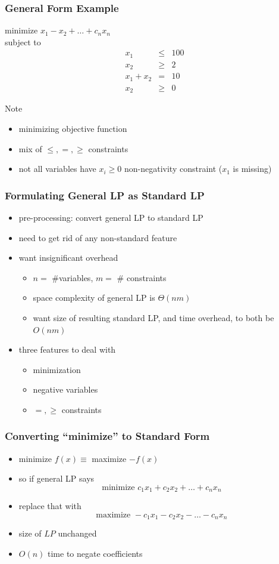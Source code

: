 \documentclass{beamer}
\begin{document}
\begin{frame} \frametitle{General Form Example}
  minimize $x_1 - x_2 + \ldots + c_n x_n$ \\
  subject to
  \begin{eqnarray*}
    x_1 &\leq& 100 \\
    x_2 &\geq& 2 \\
    x_1 + x_2 &=& 10 \\
    x_2 &\geq& 0
  \end{eqnarray*}

Note
\begin{itemize}
  \item minimizing objective function
  \item mix of $\leq, =, \geq$ constraints
  \item not all variables have $x_i \geq 0$ non-negativity constraint ($x_1$ is missing)
\end{itemize}
\end{frame}

\begin{frame} \frametitle{Formulating General LP as Standard LP}
  \begin{itemize}
    \item pre-processing: convert general LP to standard LP
    \item need to get rid of any non-standard feature
    \item want insignificant overhead
    \begin{itemize}
      \item $n = $ \#variables, $m = $ \# constraints
      \item space complexity of general LP is $\Theta(nm)$
      \item want size of resulting standard LP, and time overhead, to both be
      $O(nm)$
    \end{itemize}
    \item three features to deal with
    \begin{itemize}
      \item minimization
      \item negative variables
      \item $=, \geq$ constraints
    \end{itemize}
  \end{itemize}
\end{frame}

\begin{frame} \frametitle{Converting ``minimize'' to Standard Form}
  \begin{itemize}
    \item minimize $f(x) \equiv$ maximize $-f(x)$
    \item so if general LP says
    \[ \text{minimize } c_1 x_1 + c_2 x_2 + \ldots + c_n x_n \]
    \item replace that with
    \[ \text{maximize } -c_1 x_1 - c_2 x_2 - \ldots - c_n x_n \]
    \item size of $LP$ unchanged
    \item $O(n)$ time to negate coefficients
  \end{itemize}
\end{frame}
\end{document}
